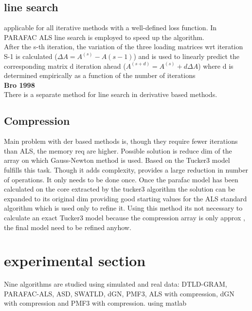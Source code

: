 \documentclass[10pt, draft]{article}
\begin{document}

\subsection{line search}
applicable for all iterative methods with a well-defined loss function.  In PARAFAC ALS line search is employed to speed up the algorithm.\\
  After the s-th iteration, the variation of the three loading matrices wrt iteration S-1 is calculated ($\Delta A = A^{(s)} - A{(s-1)}$) and is used to linearly predict the corresponding matrix d iteration ahead ($A^{(s+d)} = A^{(s)} + d \Delta A$) where d is determined empirically as a function of the number of iterations \\
  \textbf{Bro 1998}\\
  There is a separate method for line search in derivative based methods.
  
  
  \subsection{Compression}
  
  Main problem with der based methods is, though they require fewer iterations than ALS, the memory req are higher.  Possible solution is reduce dim of the array on which Gauss-Newton method is used.  Based on the Tucker3 model fulfills this task.  Though it adds complexity, provides a large reduction in number of operations.  It only needs to be done once. Once the parafac model has been calculated on the core extracted by the tucker3 algorithm the solution can be expanded to its original dim providing good starting values for the ALS standard algorithm which is used only to refine it.  Using this method its not necessary to calculate an exact Tucker3 model because the compression array is only approx , the final model need to be refined anyhow.  
  
  \section{experimental section}
  
  Nine algorithms are studied using simulated and real data: DTLD-GRAM, PARAFAC-ALS, ASD, SWATLD, dGN, PMF3, ALS with compression, dGN with compression and PMF3 with compression.  using matlab
  
\end{document}
